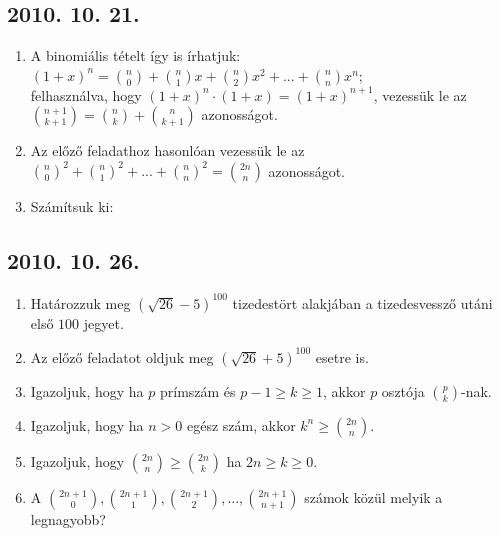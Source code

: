 \subsection*{2010. 10. 21.}
\begin{enumerate}
\item A binomiális tételt így is írhatjuk:
$(1+x)^{n}=\binom{n}{0}+\binom{n}{1}x+\binom{n}{2}x^{2}+...+\binom{n}{n}x^{n}$; \\ felhasználva, hogy $(1+x)^{n}\cdot(1+x)=(1+x)^{n+1}$, vezessük le az $\binom{n+1}{k+1}=\binom{n}{k}+\binom{n}{k+1}$ azonosságot.
\item Az előző feladathoz hasonlóan vezessük le az $\binom{n}{0}^{2}+\binom{n}{1}^{2}+...+\binom{n}{n}^{2}=\binom{2n}{n}$ azonosságot.
\item Számítsuk ki:
\end{enumerate}


\subsection*{2010. 10. 26.}
\begin{enumerate}
\item Határozzuk meg $(\sqrt{26}-5)^{100}$ tizedestört alakjában a tizedesvessző utáni első $100$ jegyet.
\item Az előző feladatot oldjuk meg $(\sqrt{26}+5)^{100}$ esetre is.
\item Igazoljuk, hogy ha $p$ prímszám és $p-1\ge{k}\ge{1}$, akkor $p$ osztója $\binom{p}{k}$-nak.
\item Igazoljuk, hogy ha $n>0$ egész szám, akkor $k^{n}\ge{\binom{2n}{n}}$.
\item Igazoljuk, hogy $\binom{2n}{n}\ge{\binom{2n}{k}}$ ha $2n\ge{k}\ge{0}$.
\item A $\binom{2n+1}{0}, \binom{2n+1}{1}, \binom{2n+1}{2},... ,\binom{2n+1}{n+1}$ számok közül melyik a legnagyobb?
\end{enumerate}


